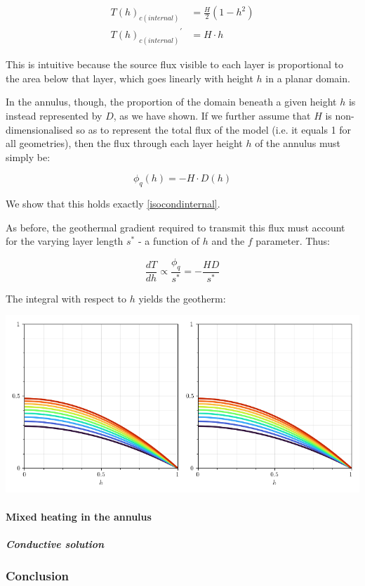 \documentclass[a4paper,11pt,oneside]{book}
\begin{document}
\begin{align*}
{T(h)}_{c(internal)} &= \frac{H}{2} \left( 1 - h^2 \right) \\
{{T(h)}_{c(internal)}}^{'} &= H\cdot h
\end{align*}

This is intuitive because the source flux visible to each layer is proportional to the area below that layer, which goes linearly with height $h$ in a planar domain.

In the annulus, though, the proportion of the domain beneath a given height $h$ is instead represented by $D$, as we have shown. If we further assume that $H$ is non-dimensionalised so as to represent the total flux of the model (i.e. it equals 1 for all geometries), then the flux through each layer height $h$ of the annulus must simply be:

\begin{equation}
{\phi_q}(h) = -H \cdot D(h)
\end{equation}

We show that this holds exactly \ref{isocondinternal}.

As before, the geothermal gradient required to transmit this flux must account for the varying layer length $s^{*}$ - a function of $h$ and the $f$ parameter. Thus:

\begin{equation}
\frac{dT}{dh} \propto \frac{\phi_q}{s^{*}} = -\frac{HD}{s^{*}}
\end{equation}

The integral with respect to $h$ yields the geotherm:

\includegraphics[width=0.7\linewidth]{files/f584a98f5b3d859cd64a1a5095d25dd2.png}

\paragraph{Mixed heating in the annulus}

\subparagraph{Conductive solution}

\subsubsection{Conclusion}
\end{document}

